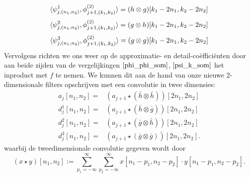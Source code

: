 \[
\langle \psi^1_{j,(n_1,n_2)} , \phi^{(2)}_{j+1,(k_1,k_2)} \rangle = (h\otimes g) [k_1-2n_1,k_2-2n_2]
\]
\[
\langle \psi^2_{j,(n_1,n_2)} , \phi^{(2)}_{j+1,(k_1,k_2)} \rangle = (g\otimes h) [k_1-2n_1,k_2-2n_2]
\]
\[
\langle \psi^3_{j,(n_1,n_2)} , \phi^{(2)}_{j+1,(k_1,k_2)} \rangle = (g\otimes g) [k_1-2n_1,k_2-2n_2]
\]
Vervolgens richten we ons weer op de approximatie- en detail-co\"effici\"enten door
aan beide zijden van de vergelijkingen $\eqref{phi_phi_som}$, $\eqref{psi_k_som}$ het inproduct
met $f$ te nemen. We kunnen dit aan de hand van onze nieuwe 2-dimensionale filters
opschrijven met een convolutie in twee dimensies:
\begin{eqnarray}
  \label{2d_coef_rec}
  a_{j}[n_1,n_2] =& (a_{j+1} \star (\bar{h} \otimes \bar{h}))[2n_1,2n_2] \\
  d^1_{j}[n_1,n_2] =&( a_{j+1} \star (\bar{h} \otimes \bar{g}))[2n_1,2n_2] \\
  d^2_{j}[n_1,n_2] =& (a_{j+1} \star (\bar{g} \otimes \bar{h}))[2n_1,2n_2] \\
  \label{2d_coef_rec_last}
  d^3_{j}[n_1,n_2] =& (a_{j+1} \star (\bar{g} \otimes \bar{g}))[2n_1,2n_2].
\end{eqnarray}
waarbij de tweedimensionale convolutie gegeven wordt door
\[
(x \star y)[n_1,n_2] := \sum_{p_1=-\infty}^\infty \sum_{p_2 = -\infty}^\infty
x[n_1 - p_1,n_2 - p_2] \cdot y[n_1-p_1, n_2 - p_2].
\]

